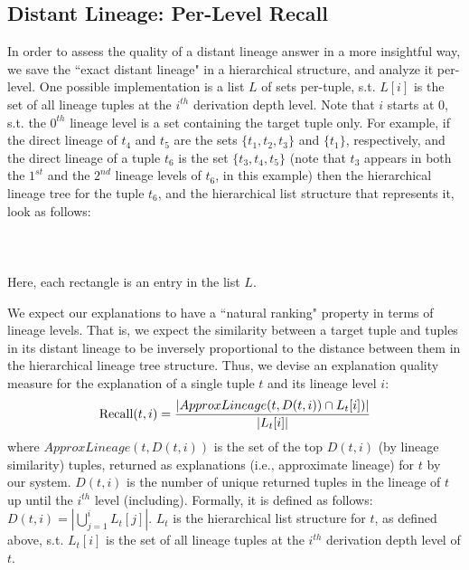 \subsection{Distant Lineage: Per-Level Recall}\label{sec:recall}
    In order to assess the quality of a distant lineage answer in a more insightful way, we save the ``exact distant lineage" in a hierarchical structure, and analyze it per-level. One possible implementation is a list $L$ of sets per-tuple, s.t. $L[i]$ is the set of all lineage tuples at the $i^{th}$ derivation depth level. Note that $i$ starts at $0$, s.t. the $0^{th}$ lineage level is a set containing the target tuple only. For example, if the direct lineage of $t_4$ and $t_5$ are the sets $\{t_1, t_2, t_3\}$ and $\{t_1\}$, respectively, and the direct lineage of a tuple $t_6$ is the set $\{t_3, t_4, t_5\}$ (note that $t_3$ appears in both the $1^{st}$ and the $2^{nd}$ lineage levels of $t_6$, in this example) then the hierarchical lineage tree for the tuple $t_6$, and the hierarchical list structure that represents it, look as follows: \\\\
     \hspace{35pt}
     \\\\
Here, each rectangle is an entry in the list $L$.
\par We expect our explanations to have a ``natural ranking" property in terms of lineage levels. That is, we expect the similarity between a target tuple and tuples in its distant lineage to be inversely proportional to the distance between them in the hierarchical lineage tree structure. Thus, we devise an explanation quality measure for the explanation of a single tuple $t$ and its lineage level $i$:
\begin{equation*}
    \operatorname{Recall}(t, i) = \frac{|ApproxLineage(t, D(t, i)) \cap L_t[i])|}{|L_t[i]|}\\
\end{equation*}
where $ApproxLineage(t, D(t, i))$ is the set of the top $D(t, i)$ (by lineage similarity) tuples, returned as explanations (i.e., approximate lineage) for $t$ by our system.
$D(t, i)$ is the number of unique returned tuples in the lineage of $t$ up until the $i^{th}$ level (including). Formally, it is defined as follows: $D(t, i) = |\bigcup\limits_{j=1}^{i} L_t[j]|$.
$L_t$ is the hierarchical list structure for $t$, as defined above, s.t. $L_t[i]$ is the set of all lineage tuples at the $i^{th}$ derivation depth level of $t$.\\

